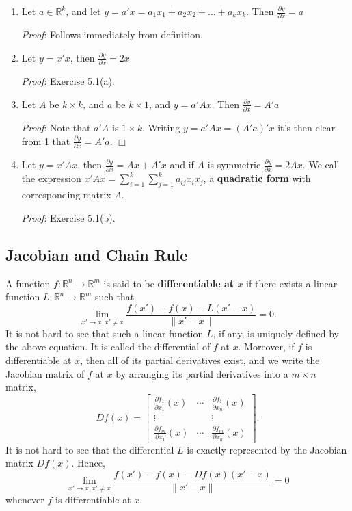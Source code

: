 \documentclass[12pt,oneside]{article}
\newcommand{\Rset}{\mathbb{R}}
\begin{document}
\begin{enumerate}
\item Let $a \in \mathbb{R}^k$, and let $y = a'x = a_1 x_1 + a_2 x_2 +
  \ldots + a_k x_k$. Then $\frac{\partial y}{\partial x} = a$

\emph{Proof}: Follows immediately from definition.

\item Let $y = x'x$, then $\frac{\partial y}{\partial x} = 2x$

\emph{Proof}: Exercise 5.1(a).

\item Let $A$ be $k \times k$, and $a$ be $k \times 1$, and $y =
  a'Ax$. Then $\frac{\partial y}{\partial x} = A'a$

\emph{Proof}:  Note that $a'A$ is $1 \times k$.  Writing $y = a'Ax = (A'a)'x$ it's then clear from 1 that $\frac{\partial y}{\partial x} = A'a$. $\Box$

\item Let $y = x'Ax$, then $\frac{\partial y}{\partial x} = Ax + A'x$
  and if $A$ is symmetric $\frac{\partial y}{\partial x} = 2Ax$. We
  call the expression $x'Ax = \displaystyle\sum_{i=1}^k
  {\displaystyle\sum_{j=1}^k {a_{ij} x_i x_j}}$, a \textbf{quadratic
  form} with corresponding matrix $A$.

\emph{Proof}: Exercise 5.1(b).

\end{enumerate}
\subsection{Jacobian and Chain Rule} \label{Sec5.2}

\noindent
A function $f: \Rset^n \to \Rset^m$ is said to be \textbf{differentiable at $x$} if there exists a linear function
$L: \Rset^n \to \Rset^m$ such that
\[
\lim_{x' \to x, x'\ne x}\frac{f(x')-f(x)-L(x'-x)}{\|x'-x\|} =0.
\]
It is not hard to see that such a linear function $L$, if any, is uniquely defined by the above equation. It is called the differential of $f$ at $x$. Moreover, if $f$ is differentiable at $x$, then all of its partial derivatives exist, and we write the Jacobian matrix of $f$ at $x$ by arranging its partial derivatives into a $m\times n$ matrix,
\[
Df(x) = \begin{bmatrix}
\frac{\partial f_1}{\partial x_1} (x) & \cdots & \frac{\partial f_1}{\partial x_n} (x) \\
\vdots & & \vdots \\
\frac{\partial f_m}{\partial x_1} (x) & \cdots & \frac{\partial f_m}{\partial x_n} (x)
\end{bmatrix}.
\]
It is not hard to see that the differential $L$ is exactly  represented by the Jacobian matrix $Df(x)$. Hence, 
$$\lim_{x' \to x, x'\ne x}\frac{f(x')-f(x)-Df(x)(x'-x)}{\|x'-x\|} =0$$
whenever $f$ is differentiable at $x$.
\end{document}
